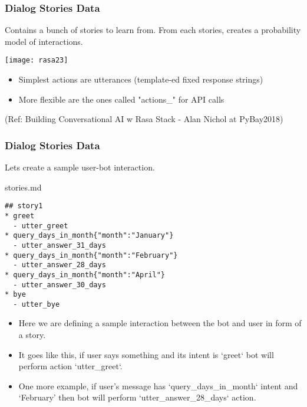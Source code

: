  \begin{frame}[fragile]\frametitle{Dialog Stories Data}

Contains a bunch of stories to learn from. From each stories, creates a probability model of interactions.

\begin{center}
\texttt{[image: rasa23]}
\end{center}

\begin{itemize}
\item Simplest actions are utterances (template-ed fixed response strings)
\item More flexible are the ones called "actions\_" for API calls
\end{itemize}

{\tiny (Ref: Building Conversational AI w Rasa Stack - Alan Nichol at PyBay2018)}

\end{frame}


 \begin{frame}[fragile]\frametitle{Dialog Stories Data}
Lets create a sample user-bot interaction.

stories.md
\begin{lstlisting}
## story1              
* greet              
  - utter_greet
* query_days_in_month{"month":"January"}
  - utter_answer_31_days
* query_days_in_month{"month":"February"}
  - utter_answer_28_days
* query_days_in_month{"month":"April"}
  - utter_answer_30_days
* bye               
  - utter_bye
\end{lstlisting}

\begin{itemize}
\item Here we are defining a sample interaction between the bot and user in form of a story. 
\item It goes like this, if user says something and its intent is `greet` bot will perform action `utter\_greet`. 
\item One more example, if user's message has `query\_days\_in\_month` intent and `February' then bot will perform `utter\_answer\_28\_days` action.
\end{itemize}
\end{frame}

